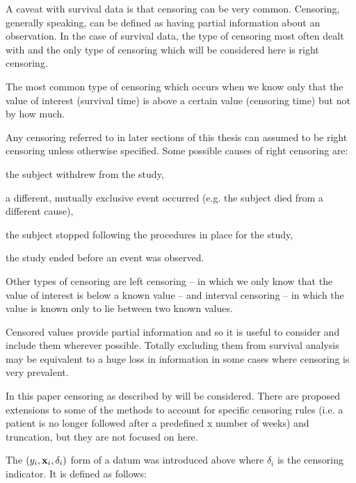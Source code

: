 A caveat with survival data is that censoring can be very common. Censoring, generally speaking, can be defined as having partial information about an observation. In the case of survival data, the type of censoring most often dealt with and the only type of censoring which will be considered here is right censoring.

\begin{definition}\label{right-censoring}
The most common type of censoring which occurs when we know only that the value of interest (survival time) is above a certain value (censoring time) but not by how much.
\end{definition}

Any censoring referred to in later sections of this thesis can assumed to be right censoring unless otherwise specified. Some possible causes of right censoring are:
\begin{itemize}
\begin{spacing}{0}
    \item the subject withdrew from the study,
    \item a different, mutually exclusive event occurred (e.g. the subject died from a different cause),
    \item the subject stopped following the procedures in place for the study,
    \item the study ended before an event was observed.
\end{spacing}
\end{itemize}

Other types of censoring are left censoring -- in which we only know that the value of interest is below a known value -- and interval censoring -- in which the value is known only to lie between two known values.

Censored values provide partial information and so it is useful to consider and include them wherever possible. Totally excluding them from survival analysis may be equivalent to a huge loss in information in some cases where censoring is very prevalent.

In this paper censoring as described by  will be considered. There are proposed extensions to some of the methods to account for specific censoring rules (i.e. a patient is no longer followed after a predefined x number of weeks) and truncation, but they are not focused on here. 

The $(y_i, \textbf{x}_i, \delta_i)$ form of a datum was introduced above where $\delta_i$ is the censoring indicator. It is defined as follows:

